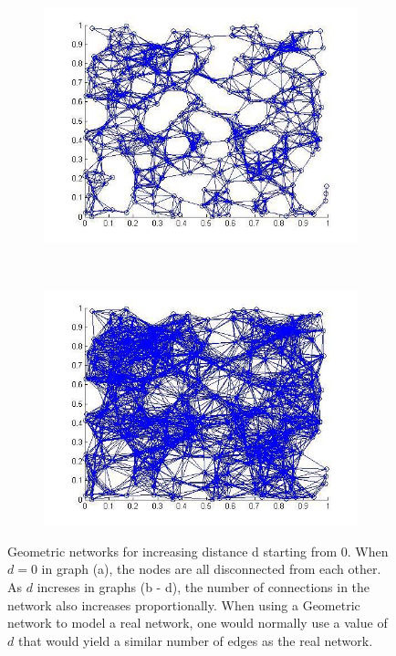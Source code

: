 \begin{figure}
  \begin{subfigure}[b]{0.33\textwidth}
    \centering
    \includegraphics[width=\textwidth]{images/geometric3.png}
    \caption{}
    \label{fig:geo3}    
   \end{subfigure}
    ~ %
  \begin{subfigure}[b]{0.33\textwidth}
    \centering
    \includegraphics[width=\textwidth]{images/geometric5.png}
    \caption{}
    \label{fig:geo4}    
   \end{subfigure}
   \caption{Geometric networks for increasing distance d starting from
0. When $d = 0$ in graph (a), the nodes are all disconnected from each other. As
$d$ increses in graphs (b - d), the number of connections in the network also
increases proportionally. When using a Geometric network to model a real
network, one would normally use a value of $d$ that would yield a similar number
of edges as the real network.}
   \label{fig:geometric} 
\end{figure}

